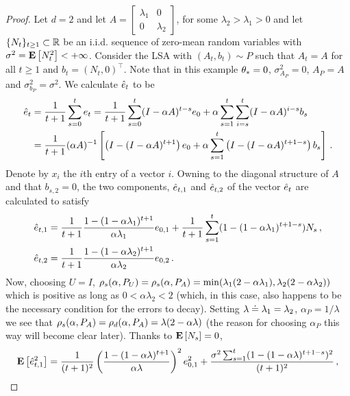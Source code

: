 \begin{proof}
Let $d=2$ and let
$A=\begin{bmatrix} \lambda_{1} &0\\ 0& \lambda_{2}\end{bmatrix}$, 
for some $\lambda_{2}>\lambda_{1}>0$ and let $\{N_t\}_{t\ge 1}\subset \mathbb{R}$ be an i.i.d. sequence of zero-mean random variables with $\sigma^2 = \mathbf{E}\left[ N_t^2 \right]<+\infty$.
Consider the LSA with $(A_t,b_t)\sim P$ such that 
$A_t=A$ for all $t\ge 1$ 
and $b_t = (N_t,0)^\top$.
Note that in this example $\theta_*=0$, $\sigma_{A_P}^2 = 0$, $A_P=A$ and $\sigma_{b_P}^2 = \sigma^2$.
We calculate $\hat{e}_t$ to be
\begin{align*}
\hat{e}_t&=\frac{1}{t+1}\sum_{s=0}^t e_t = \frac{1}{t+1}\sum_{s=0}^t (I-\alpha A)^{t-s} e_0 +\alpha \sum_{s=1}^t \sum_{i=s}^t (I-\alpha A)^{i-s} b_s\\
&=\frac{1}{t+1}(\alpha A)^{-1}\left[\left(I-(I-\alpha A)^{t+1}\right)e_0 + \alpha \sum_{s=1}^t \left(I-(I-\alpha A)^{t+1-s}\right) b_s\right]\,.
\end{align*}
Denote by $x_i$ the $i$th entry of a vector $i$.
Owning to the diagonal structure of $A$ and that $b_{s,2}=0$,
the two components, $\hat{e}_{t,1}$ and $\hat{e}_{t,2}$ of the vector $\hat{e}_t$ are calculated to satisfy
\begin{align*}
\hat{e}_{t,1} & =  \frac{1}{t+1} \frac{1-(1-\alpha \lambda_1)^{t+1}}{ \alpha \lambda_1} e_{0,1}
					+ \frac{1}{t+1} \sum_{s=1}^t (1-(1-\alpha \lambda_1)^{t+1-s}) N_s\,,\\
\hat{e}_{t,2} & =  \frac{1}{t+1} \frac{1-(1-\alpha \lambda_2)^{t+1}}{ \alpha \lambda_2} e_{0,2}\,.
\end{align*}
Now, choosing $U=I$, $\rho_s(\alpha,P_U) = \rho_s(\alpha,P_A) = \min( \lambda_1(2-\alpha \lambda_1), \lambda_2 (2-\alpha \lambda_2) )$ which is positive as long as $0<\alpha \lambda_2<2$ (which, in this case, also happens to be the necessary condition for the errors to decay).
Setting $\lambda \doteq \lambda_1=\lambda_2$,
$\alpha_P = 1/\lambda$ we see that 
$\rho_s(\alpha,P_A)=\rho_d(\alpha,P_A) = \lambda(2-\alpha \lambda)$ (the reason for choosing $\alpha_P$ this way will become clear later). 
Thanks to $\mathbf{E}\left[N_s\right]=0$,
\begin{align*}
\mathbf{E}\left[\hat{e}^2_{t,1}\right] =
 \frac{1}{(t+1)^2} \left(\frac{1-(1-\alpha \lambda)^{t+1}}{ \alpha \lambda}\right)^2 e_{0,1}^2
					+ \frac{ \sigma^2 \sum_{s=1}^t (1-(1-\alpha \lambda)^{t+1-s})^2 }{(t+1)^2}\,,
\end{align*}

\end{proof}
